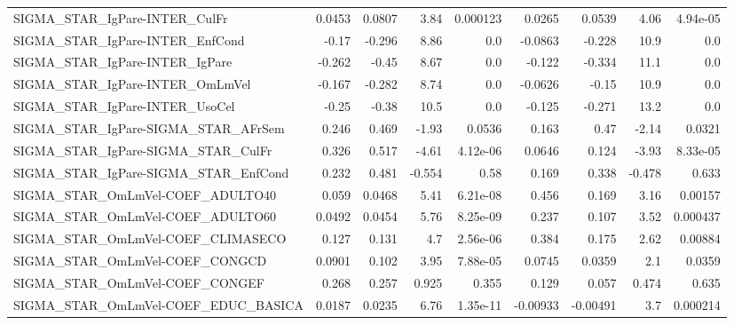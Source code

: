 \begin{tabular}{lrrrrrrrr}
SIGMA\_STAR\_IgPare-INTER\_CulFr         &      0.0453 &       0.0807 &    3.84 & 0.000123 &     0.0265 &      0.0539 &         4.06 &      4.94e-05 \\
SIGMA\_STAR\_IgPare-INTER\_EnfCond       &       -0.17 &       -0.296 &    8.86 &      0.0 &    -0.0863 &      -0.228 &         10.9 &           0.0 \\
SIGMA\_STAR\_IgPare-INTER\_IgPare        &      -0.262 &        -0.45 &    8.67 &      0.0 &     -0.122 &      -0.334 &         11.1 &           0.0 \\
SIGMA\_STAR\_IgPare-INTER\_OmLmVel       &      -0.167 &       -0.282 &    8.74 &      0.0 &    -0.0626 &       -0.15 &         10.9 &           0.0 \\
SIGMA\_STAR\_IgPare-INTER\_UsoCel        &       -0.25 &        -0.38 &    10.5 &      0.0 &     -0.125 &      -0.271 &         13.2 &           0.0 \\
SIGMA\_STAR\_IgPare-SIGMA\_STAR\_AFrSem   &       0.246 &        0.469 &   -1.93 &   0.0536 &      0.163 &        0.47 &        -2.14 &        0.0321 \\
SIGMA\_STAR\_IgPare-SIGMA\_STAR\_CulFr    &       0.326 &        0.517 &   -4.61 & 4.12e-06 &     0.0646 &       0.124 &        -3.93 &      8.33e-05 \\
SIGMA\_STAR\_IgPare-SIGMA\_STAR\_EnfCond  &       0.232 &        0.481 &  -0.554 &     0.58 &      0.169 &       0.338 &       -0.478 &         0.633 \\
SIGMA\_STAR\_OmLmVel-COEF\_ADULTO40      &       0.059 &       0.0468 &    5.41 & 6.21e-08 &      0.456 &       0.169 &         3.16 &       0.00157 \\
SIGMA\_STAR\_OmLmVel-COEF\_ADULTO60      &      0.0492 &       0.0454 &    5.76 & 8.25e-09 &      0.237 &       0.107 &         3.52 &      0.000437 \\
SIGMA\_STAR\_OmLmVel-COEF\_CLIMASECO     &       0.127 &        0.131 &     4.7 & 2.56e-06 &      0.384 &       0.175 &         2.62 &       0.00884 \\
SIGMA\_STAR\_OmLmVel-COEF\_CONGCD        &      0.0901 &        0.102 &    3.95 & 7.88e-05 &     0.0745 &      0.0359 &          2.1 &        0.0359 \\
SIGMA\_STAR\_OmLmVel-COEF\_CONGEF        &       0.268 &        0.257 &   0.925 &    0.355 &      0.129 &       0.057 &        0.474 &         0.635 \\
SIGMA\_STAR\_OmLmVel-COEF\_EDUC\_BASICA   &      0.0187 &       0.0235 &    6.76 & 1.35e-11 &   -0.00933 &    -0.00491 &          3.7 &      0.000214 \\

\end{tabular}
